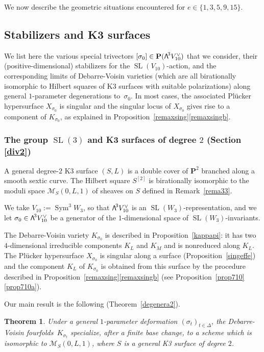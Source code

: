 \documentclass[11pt]{article}
\let\mathcal\mathscr
\newtheorem{theo}[lemm]{Theorem}
\theoremstyle{definition}
\renewcommand\P{{\mathbf P}}\let\PP\P
\newcommand\cM{\mathcal{M}}
\DeclareMathOperator{\Sym}{Sym}
\DeclareMathOperator{\SL}{SL}
\newcommand\bw[1]{{\hbox{\large$\mathsf{\Lambda}$}^{\!#1}}}
\newcommand\hilbS{S^{[2]}}
\begin{document}
We now describe the
geometric situations encountered for $e\in\{1,3,5,9,15\}$.

\subsection{Stabilizers and K3 surfaces}\label{sec11}

We list here the various special trivectors $[\sigma_0]\in \P(\bw3V_{10}^\vee)$ that we consider,
their (positive-dimensional) stabilizers for the $\SL(V_{10})$-action, and the corresponding limits of Debarre-Voisin varieties
(which are all birationally isomorphic to Hilbert squares of K3 surfaces with suitable polarizations) along general $1$-parameter degenerations to~$\sigma_0$. In most cases, the associated Plücker hypersurface $X_{\sigma_0}$ is singular and the singular locus of $X_{\sigma_0}$ gives rise to a component of $K_{\sigma_0}$, as explained in Proposition~\ref{remaxsing}\eqref{remaxsingb}.

\subsubsection{The group $\SL(3)$ and K3 surfaces of degree $2$ (Section \ref{div2})} \label{s111}

A general degree\nobreakdash-$2$ K3 surface $(S,L)$ is a double cover of $ \P^2$ branched along a smooth sextic curve. The Hilbert square $\hilbS $ is birationally isomorphic to the moduli space $\cM_S(0,L,1)$ of sheaves on $S$ defined in Remark~\ref{rema33}.

We take $V_{10}:=\Sym^3 \!W_3$, so that $\bw3 V^{\vee}_{10}$ is an $\SL(W_3)$-representation, and we let $\sigma_0\in \bw3 V^{\vee}_{10}$ be a generator of the $1$-dimensional space of
$\SL(W_3)$-invariants.

The Debarre-Voisin variety $K_{\sigma_0}$ is described in Proposition~\ref{kappapi}: it has two $4$-dimen\-sional irreducible components $K_L$ and $K_M$ and is nonreduced along $K_L$. The Plücker hypersurface $X_{\sigma_0}$ is singular along a surface (Proposition~\ref{singeffe}) and the
component $K_L$ of $K_{\sigma_0}$ is obtained from this surface by the procedure described in Proposition~\ref{remaxsing}\eqref{remaxsingb} (see Proposition~\ref{prop710}\eqref{prop710a}).

Our main result is the following (Theorem~\ref{degenera2}).

{
\begin{theo} \label{theodue}
Under a general $1$-parameter deformation
$(\sigma_t)_{t\in \Delta}$, the Debarre-Voisin fourfolds~$K_{\sigma_t}$ specialize, after a finite base change, to a scheme which is isomorphic
to $\cM_S(0,L,1)$, where $S$ is a general K3 surface of degree $2$.
\end{theo}}
\end{document}
